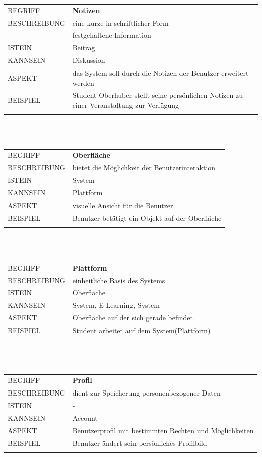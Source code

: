 \documentclass[12pt,a4paper]{article}
\begin{document}
\begin{tabular}{l p{12cm}}
BEGRIFF 	 & \textbf{Notizen} \\ 
BESCHREIBUNG & eine kurze in schriftlicher Form\\
			 & festgehaltene Information\\ 
ISTEIN   	 & Beitrag\\
KANNSEIN 	 & Diskussion\\ 
ASPEKT   	 & das System soll durch die Notizen der Benutzer erweitert werden\\
BEISPIEL 	 & Student Oberhuber stellt seine persönlichen Notizen zu einer Veranstaltung zur Verfügung\\\\
\hline
\end{tabular}\\\\  

\begin{tabular}{l p{12cm}}
BEGRIFF 	 & \textbf{Oberfläche} \\ 
BESCHREIBUNG & bietet die Möglichkeit der Benutzerinteraktion\\ 
ISTEIN   	 & System\\
KANNSEIN 	 & Plattform\\ 
ASPEKT   	 & visuelle Ansicht für die Benutzer\\
BEISPIEL 	 & Benutzer betätigt ein Objekt auf der Oberfläche\\\\
\hline
\end{tabular}\\\\  

\begin{tabular}{l p{12cm}}
BEGRIFF 	 & \textbf{Plattform} \\ 
BESCHREIBUNG & einheitliche Basis des Systems\\ 
ISTEIN   	 & Oberfläche\\
KANNSEIN 	 & System, E-Learning, System \\ 
ASPEKT   	 & Oberfläche auf der sich gerade befindet\\
BEISPIEL 	 & Student arbeitet auf dem System(Plattform)\\\\
\hline
\end{tabular}\\\\  

\begin{tabular}{l p{12cm}}
BEGRIFF 	 & \textbf{Profil} \\ 
BESCHREIBUNG & dient zur Speicherung personenbezogener Daten \\ 
ISTEIN   	 & - \\
KANNSEIN 	 & Account\\ 
ASPEKT   	 & Benutzerprofil mit bestimmten Rechten und Möglichkeiten\\
BEISPIEL 	 & Benutzer ändert sein persönliches Profilbild\\\\
\hline
\end{tabular}\\\\  
\end{document}
